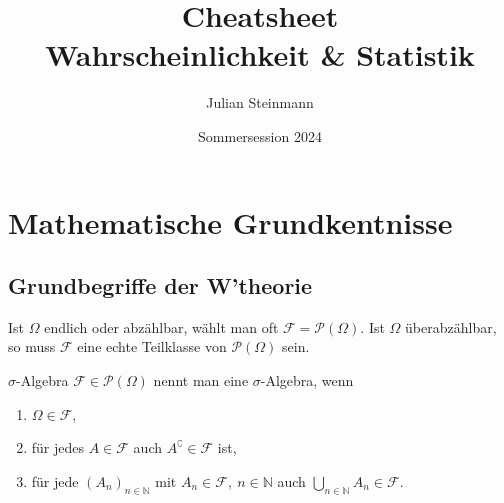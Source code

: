 \documentclass[a4paper,10pt]{article}
\title{Cheatsheet\\ Wahrscheinlichkeit \& Statistik}
\author{Julian Steinmann}
\date{\vspace{-10pt}Sommersession 2024}
\def\N{\mathbb{N}}
\def\F{\mathcal{F}}
\numberwithin{equation}{section}
\begin{document}
\small


% 

\section{Mathematische Grundkentnisse}

\subsection{Grundbegriffe der W'theorie}






Ist \( \Omega \) endlich oder abzählbar, wählt man oft \( \F = \mathcal{P}(\Omega) \).
Ist \( \Omega \) überabzählbar, so muss \( \F \) eine echte Teilklasse von \( \mathcal{P}(\Omega) \) sein.
\begin{mainbox}{\( \sigma \)-Algebra}
    \( \F \in \mathcal{P}(\Omega) \) nennt man eine \( \sigma \)-Algebra, wenn
    \begin{enumerate}
        \item \( \Omega \in \F \),
        \item für jedes \( A \in \F \) auch \( A^\complement \in \F \) ist,
        \item für jede \( (A_n)_{n \in \N} \) mit \( A_n \in \F, \ n \in \N\) auch \( \bigcup_{n \in \N} A_n \in \F \).
    \end{enumerate}
\end{mainbox}
\end{document}
